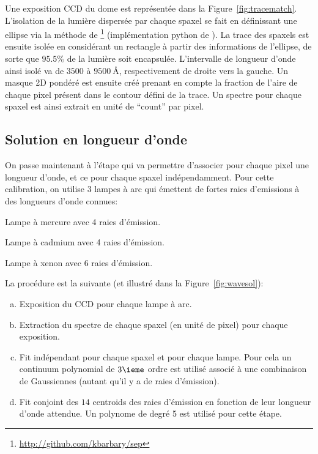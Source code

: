 \documentclass[../main/main.tex]{subfiles}
\begin{document}

Une exposition CCD du dome est représentée dans la
Figure~\ref{fig:tracematch}. L'isolation de la lumière dispersée par
chaque spaxel se fait en définissant une ellipse
via la méthode  de
\footnote{\url{http://github.com/kbarbary/sep}}
\citep{Barbary2016Sep} (implémentation python de 
\cite{Bertinsextractor}). La trace des spaxels est ensuite isolée en
considérant un rectangle à partir des informations de l'ellipse, de
sorte que $95.5\%$ de la lumière soit encapsulée. L'intervalle de
longueur d'onde ainsi isolé va de $3500$ à $\SI{9500}{\angstrom}$,
respectivement de droite vers la gauche. Un masque 2D pondéré est
ensuite créé prenant en compte la fraction de l'aire de chaque pixel
présent dans le contour défini de la trace. Un spectre pour chaque
spaxel est ainsi extrait en unité de ``count'' par pixel.

\subsection{Solution en longueur d'onde}\label{ssec:wavesol}
On passe maintenant à l'étape qui va permettre d'associer pour chaque pixel une
longueur d'onde, et ce pour chaque spaxel indépendamment.
Pour cette calibration, on utilise 3 lampes à arc qui émettent de fortes
raies d'emissions à des longueurs d'onde connues:

\begin{description}[itemsep=0em]
\item[Hg] Lampe à mercure avec 4 raies d'émission.
\item[Cd] Lampe à cadmium avec 4 raies d'émission.
\item[Xe] Lampe à xenon avec 6 raies d'émission.
\end{description}

La procédure est la suivante (et illustré dans la Figure~\ref{fig:wavesol}):
\begin{enumerate}[(a)]
\item Exposition du CCD pour chaque lampe à arc.
\item Extraction du spectre de chaque spaxel (en unité de pixel) pour chaque exposition.
\item Fit indépendant pour chaque spaxel et pour chaque
  lampe. Pour cela un continuum polynomial de $3\ieme$ ordre est
  utilisé associé à une combinaison de Gaussiennes (autant qu'il y a de
  raies d'émission).
\item Fit conjoint des $14$ centroids des raies d'émission en fonction de
  leur longueur d'onde attendue. Un polynome de degré 5 est utilisé pour
  cette étape.
\end{enumerate}
\end{document}
